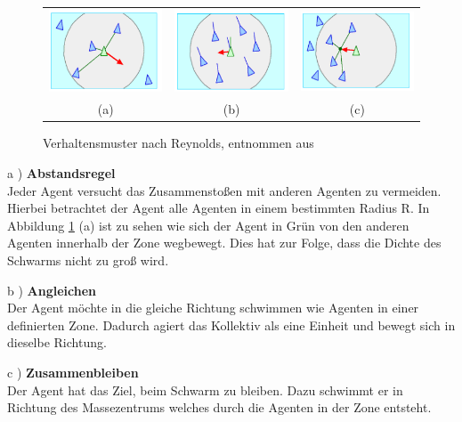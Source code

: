 \begin{figure}[h]
\centering
\begin{tabular}{ccc}
\includegraphics[width=40mm]{figures/Grundlagen/separation.png} &
\includegraphics[width=40mm]{figures/Grundlagen/alignment.png} &
\includegraphics[width=40mm]{figures/Grundlagen/cohesion.png} \\
(a) & (b) & (c)\\
\end{tabular}
\caption{Verhaltensmuster nach Reynolds, \label{fig:BoidsRegeln} entnommen aus \citep{Reynolds1999}}
\end{figure}

a ) \textbf{Abstandsregel} \\
Jeder Agent versucht das Zusammenstoßen mit anderen Agenten zu vermeiden. Hierbei betrachtet der Agent alle Agenten in einem bestimmten Radius R. 
In Abbildung \ref{fig:BoidsRegeln} (a) ist zu sehen wie sich der Agent in Grün von den anderen Agenten innerhalb der Zone wegbewegt. Dies hat zur Folge, dass die Dichte des Schwarms nicht zu groß wird.

b ) \textbf{Angleichen}\\
Der Agent möchte in die gleiche Richtung schwimmen wie Agenten in einer definierten Zone.
Dadurch agiert das Kollektiv als eine Einheit und bewegt sich in dieselbe Richtung.

c ) \textbf{Zusammenbleiben}\\
Der Agent hat das Ziel, beim Schwarm zu bleiben. Dazu schwimmt er in Richtung des Massezentrums welches durch die Agenten in der Zone entsteht.

